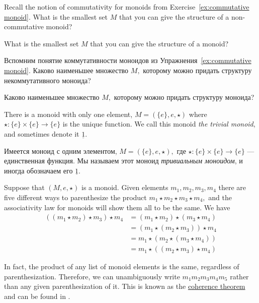 \documentclass[../main/CT4S-EN-RU]{subfiles}
\begin{document}
\begin{exerciseENG}
Recall the notion of commutativity for monoids from Exercise~\ref{ex:commutative monoid}.
\sexc What is the smallest set $M$ that you can give the structure of a non-commutative monoid?
\item What is the smallest set $M$ that you can give the structure of a monoid?
\endsexc
\end{exerciseENG}

\begin{exerciseRUS}
Вспомним понятие коммутативности моноидов из Упражнения~\ref{ex:commutative monoid}.
\sexc Каково наименьшее множество $M,$ которому можно придать структуру некоммутативного моноида?
\item Каково наименьшее множество $M,$ которому можно придать структуру моноида?
\endsexc
\end{exerciseRUS}

\begin{exampleENG}\label{ex:trivial monoid}
There is a monoid with only one element, $M=(\{e\},e,{⋆})$ where ${⋆}\colon\{e\}\times\{e\}{→}\{e\}$ is the unique function. We call this monoid {\em the trivial monoid}, and sometimes denote it $\underline{1}.$
\end{exampleENG}

\begin{exampleRUS}\label{ex:trivial monoid}
Имеется моноид с одним элементом, $M=(\{e\},e,{⋆}),$ где ${⋆}\colon\{e\}\times\{e\}{→}\{e\}$ — единственная функция. Мы называем этот моноид {\em тривиальным моноидом}, и иногда обозначаем его $\underline{1}.$
\end{exampleRUS}

\begin{exampleENG}
Suppose that $(M,e,{⋆})$ is a monoid. Given elements $m_1,m_2,m_3,m_4$ there are five different ways to parenthesize the product $m_1{⋆} m_2{⋆} m_3{⋆} m_4,$ and the associativity law for monoids will show them all to be the same. We have
\begin{align*}
((m_1{⋆} m_2){⋆} m_3){⋆} m_4&=(m_1{⋆} m_2){⋆} (m_3{⋆} m_4)\\
&=(m_1{⋆}(m_2{⋆} m_3)){⋆} m_4\\
&=m_1{⋆}(m_2{⋆} (m_3{⋆} m_4))\\
&=m_1{⋆}((m_2{⋆} m_3){⋆} m_4)
\end{align*}

In fact, the product of any list of monoid elements is the same, regardless of parenthesization. Therefore, we can unambiguously write $m_1m_2m_3m_4m_5$ rather than any given parenthesization of it. This is known as the \href{http://en.wikipedia.org/wiki/Coherence_theorem}{\text coherence theorem} and can be found in \cite{Mac}.
\end{exampleENG}
\end{document}
